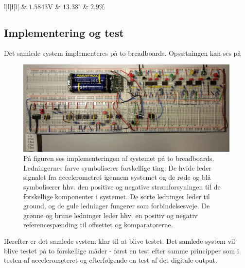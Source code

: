 \begin{table}[H]
\begin{tabular}{l|l|l|l|}
		               & $1.5843$V                                                                   & $13.38^{\circ}$                                                              & $2.9\%$                                                    \\ \hline
	\end{tabular}
	\caption{I tabellen ses resultatet af afvigelsen i det simulerede samlede system.}
	\label{tab:samlet_sim}
\end{table}

\subsection{Implementering og test}
Det samlede system implementeres på to breadboards. Opsætningen kan ses på 
\begin{figure}[H]
	\centering
	\includegraphics[scale=.22]{figures/cProblemloesning/Samlet_system2.jpg}
	\caption{På figuren ses implementeringen af systemet på to breadboards. Ledningernes farve symboliserer forskellige ting: De hvide leder signalet fra accelerometret igennem systemet og de røde og blå symboliserer hhv. den positive og negative strømforsyningen til de forskellige komponenter i systemet. De sorte ledninger leder til ground, og de gule ledninger fungerer som forbindelsesveje. De grønne og brune ledninger leder hhv. en positiv og negativ referencespænding til offsettet og komparatorerne.}
	\label{fig:samlet_system_real}
\end{figure}
\noindent Herefter er det samlede system klar til at blive testet. Det samlede system vil blive testet på to forskellige måder - først en test efter samme principper som i testen af accelerometeret og efterfølgende en test af det digitale output. \\

